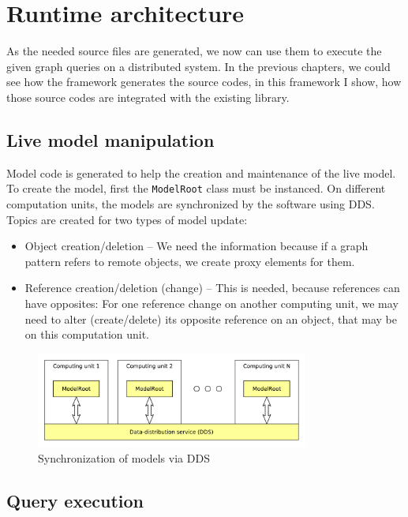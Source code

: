 %
\chapter{Runtime architecture}
%

As the needed source files are generated, we now can use them to execute the given graph queries on a distributed system. In the previous chapters, we could see how the framework generates the source codes, in this framework I show, how those source codes are integrated with the existing \cpp{} library.



\section{Live model manipulation}
Model code is generated to help the creation and maintenance of the live model.
To create the model, first the \texttt{ModelRoot} class must be instanced.
On different computation units, the models are synchronized by the software using DDS.
Topics are created for two types of model update:
\begin{itemize}
	\item Object creation/deletion -- We need the information because if a graph pattern refers to remote objects, we create proxy elements for them.  
	\item Reference creation/deletion (change) -- This is needed, because references can have opposites: For one reference change on another computing unit, we may need to alter (create/delete) its opposite reference on an object, that may be on this computation unit.
\end{itemize}

\begin{figure}[H]
	\begin{center}
		\includegraphics[width=0.8\textwidth]{figures/model-dds.pdf}
		\caption{ Synchronization of models via DDS }
		\label{fig:model-dds}
	\end{center}
\end{figure}

\section{Query execution}

